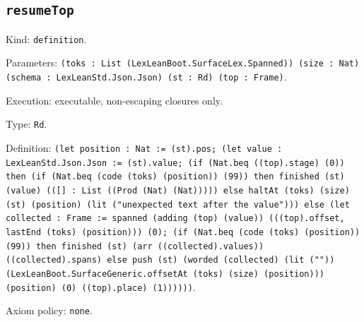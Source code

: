 \documentclass[11pt]{article}
\begin{document}
\subsection*{\texttt{resumeTop}}
\noindent Kind: \texttt{definition}.\par
\noindent Parameters: \texttt{(toks : List (LexLeanBoot.SurfaceLex.Spanned)) (size : Nat) (schema : LexLeanStd.Json.Json) (st : Rd) (top : Frame)}.\par
\noindent Execution: executable, non-escaping closures only.\par
\noindent Type: \texttt{Rd}.\par
\noindent Definition: \texttt{(let position : Nat := (st).pos; (let value : LexLeanStd.Json.Json := (st).value; (if (Nat.beq ((top).stage) (0)) then (if (Nat.beq (code (toks) (position)) (99)) then finished (st) (value) (([] : List ((Prod (Nat) (Nat))))) else haltAt (toks) (size) (st) (position) (lit ("unexpected text after the value"))) else (let collected : Frame := spanned (adding (top) (value)) (((top).offset, lastEnd (toks) (position))) (0); (if (Nat.beq (code (toks) (position)) (99)) then finished (st) (arr ((collected).values)) ((collected).spans) else push (st) (worded (collected) (lit ("")) (LexLeanBoot.SurfaceGeneric.offsetAt (toks) (size) (position))) (position) (0) ((top).place) (1))))))}.\par
\noindent Axiom policy: \texttt{none}.\par
\end{document}
